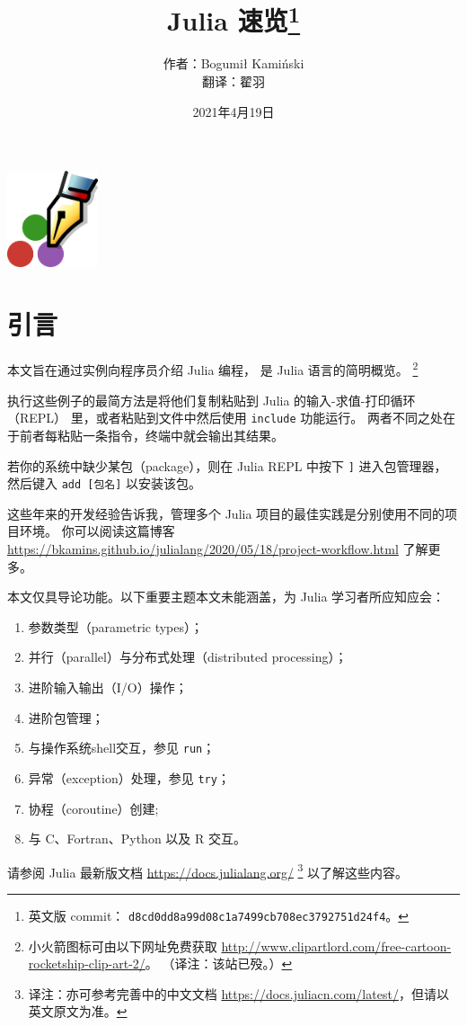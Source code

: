\documentclass[10pt,a4paper]{article}
\begin{document}
\title{Julia 速览\footnote{英文版 commit： \texttt{d8cd0dd8a99d08c1a7499cb708ec3792751d24f4}。}}
\author{作者：Bogumi\l{} Kami\'n{}ski\\翻译：翟羽}
\date{2021年4月19日}
\maketitle

{\centering
\includegraphics[width=0.2\textwidth]{pen.png}\par
}

\tableofcontents

\section{引言}
本文旨在通过实例向程序员介绍 Julia 编程，
是 Julia 语言的简明概览。
\footnote{小火箭图标可由以下网址免费获取  \url{http://www.clipartlord.com/free-cartoon-rocketship-clip-art-2/}。
（译注：该站已殁。）}

执行这些例子的最简方法是将他们复制粘贴到 Julia 的输入-求值-打印循环（REPL） 里，或者粘贴到文件中然后使用 \lstinline|include| 功能运行。
两者不同之处在于前者每粘贴一条指令，终端中就会输出其结果。

若你的系统中缺少某包（package），则在 Julia REPL 中按下 \lstinline|]| 进入包管理器，
然后键入 \lstinline|add [包名]| 以安装该包。

这些年来的开发经验告诉我，管理多个 Julia 项目的最佳实践是分别使用不同的项目环境。
你可以阅读这篇博客
\url{https://bkamins.github.io/julialang/2020/05/18/project-workflow.html} 
了解更多。

本文仅具导论功能。以下重要主题本文未能涵盖，为 Julia 学习者所应知应会：
\begin{enumerate}[label=\arabic*),nolistsep]
  \item 参数类型（parametric types）；
  \item 并行（parallel）与分布式处理（distributed processing）；
  \item 进阶输入输出（I/O）操作；
  \item 进阶包管理；
  \item 与操作系统shell交互，参见 \lstinline|run|；
  \item 异常（exception）处理，参见 \lstinline|try|；
  \item 协程（coroutine）创建;
  \item 与 C、Fortran、Python 以及 R 交互。
\end{enumerate}
请参阅 Julia 最新版文档 \url{https://docs.julialang.org/} 
\footnote{译注：亦可参考完善中的中文文档 \url{https://docs.juliacn.com/latest/}，但请以英文原文为准。} 以了解这些内容。
\end{document}
